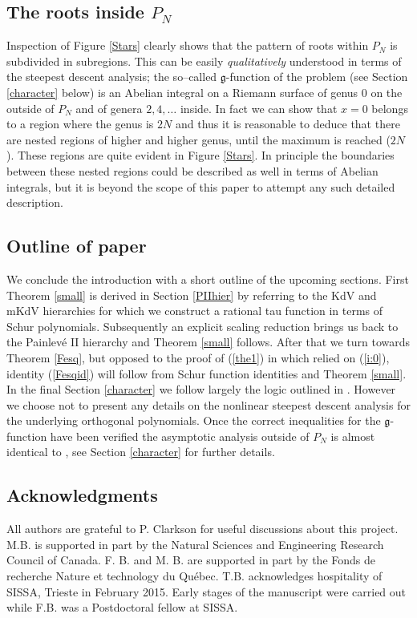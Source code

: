 \documentclass[10pt,reqno,oneside]{amsart}
\def \gg{{\mathfrak g}}
\numberwithin{equation}{section}
\def\eqref#1{(\ref{#1})}
\begin{document}
\subsection{The roots inside $P_N$}
Inspection of Figure \ref{Stars} clearly shows that the pattern of roots within $P_N$ is subdivided in subregions.
This can be easily {\em qualitatively} understood in terms of the steepest descent analysis; the so--called $\gg$-function of the problem (see Section \ref{character} below) is an Abelian integral on a Riemann surface of genus $0$ on the outside of $P_N$ and of genera $2,4,\dots$ inside. In fact we can show that $x=0$ belongs to a region where the genus is $2N$ and thus it is reasonable to deduce that there are nested regions of higher and higher genus, until the maximum is reached ($2N$). These regions are quite evident in Figure \ref{Stars}. 
In principle the boundaries between these nested regions could be described as well in terms of Abelian integrals, but it is beyond the scope of this paper to attempt any such detailed description. 

\subsection{Outline of paper} We conclude the introduction with a short outline of the upcoming sections. First Theorem \ref{small} is derived in Section \ref{PIIhier} by referring to the KdV and mKdV hierarchies for which we construct a rational tau function in terms of Schur polynomials. Subsequently an explicit scaling reduction brings us back to the Painlev\'e II hierarchy and Theorem \ref{small} follows. After that we turn towards Theorem \ref{Fesq}, but opposed to the proof of \eqref{the1} in \cite{BB} which relied on \eqref{i:0}, identity \eqref{Fesqid} will follow from Schur function identities and Theorem \ref{small}. In the final Section \ref{character} we follow largely the logic outlined in \cite{BB}. However we choose not to present any details on the nonlinear steepest descent analysis for the underlying orthogonal polynomials. Once the correct inequalities for the $\mathfrak{g}$-function have been verified the asymptotic analysis outside of $P_N$ is almost identical to \cite{BB}, see Section \ref{character} for further details.
%
\subsection{Acknowledgments} 
All authors are grateful to P. Clarkson for useful discussions about this project. M.B. is supported
in part by the Natural Sciences and Engineering Research Council of Canada. F. B. and M. B. are supported in part by the Fonds de recherche Nature et technology du Qu\'ebec. T.B. acknowledges hospitality of SISSA, Trieste in February 2015.
Early stages of the manuscript were carried out while F.B. was a Postdoctoral fellow at SISSA.
%
\end{document}
